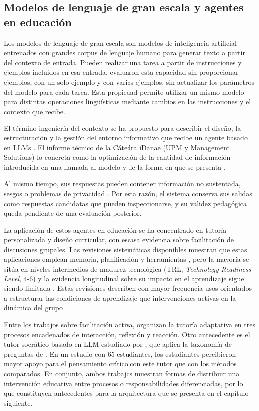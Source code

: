 \subsection{Modelos de lenguaje de gran escala y agentes en educación}

Los modelos de lenguaje de gran escala son modelos de inteligencia artificial entrenados con grandes corpus de lenguaje humano para generar texto a partir del contexto de entrada. Pueden realizar una tarea a partir de instrucciones y ejemplos incluidos en esa entrada. \textcite{BrownEtAl2020} evaluaron esta capacidad sin proporcionar ejemplos, con un solo ejemplo y con varios ejemplos, sin actualizar los parámetros del modelo para cada tarea. Esta propiedad permite utilizar un mismo modelo para distintas operaciones lingüísticas mediante cambios en las instrucciones y el contexto que recibe.

El término ingeniería del contexto se ha propuesto para describir el diseño, la estructuración y la gestión del entorno informativo que recibe un agente basado en LLMs \parencite{Vishnyakova2026}. El informe técnico de la Cátedra iDanae (UPM y Management Solutions) lo concreta como la optimización de la cantidad de información introducida en una llamada al modelo y de la forma en que se presenta \parencite{IdanaeUPM2026}.

Al mismo tiempo, sus respuestas pueden contener información no sustentada, sesgos o problemas de privacidad \parencite{ChuEtAl2025}. Por esta razón, el sistema conserva sus salidas como respuestas candidatas que pueden inspeccionarse, y su validez pedagógica queda pendiente de una evaluación posterior.

La aplicación de estos agentes en educación se ha concentrado en tutoría personalizada y diseño curricular, con escasa evidencia sobre facilitación de discusiones grupales. Las revisiones sistemáticas disponibles muestran que estas aplicaciones emplean memoria, planificación y herramientas \parencite{ChuEtAl2025}, pero la mayoría se sitúa en niveles intermedios de madurez tecnológica (TRL, \textit{Technology Readiness Level}, 4-6) y la evidencia longitudinal sobre su impacto en el aprendizaje sigue siendo limitada \parencite{KostopoulosEtAl2025}. Estas revisiones describen con mayor frecuencia usos orientados a estructurar las condiciones de aprendizaje que intervenciones activas en la dinámica del grupo \parencite{CasebourneEtAl2025}.

Entre los trabajos sobre facilitación activa, \textcite{ChenEtAl2023tutoring} organizan la tutoría adaptativa en tres procesos encadenados de interacción, reflexión y reacción. Otro antecedente es el tutor socrático basado en LLM estudiado por \textcite{DegenAsanov2025}, que aplica la taxonomía de preguntas de \textcite{Paul1990}. En un estudio con 65 estudiantes, los estudiantes percibieron mayor apoyo para el pensamiento crítico con este tutor que con los métodos comparados. En conjunto, ambos trabajos muestran formas de distribuir una intervención educativa entre procesos o responsabilidades diferenciadas, por lo que constituyen antecedentes para la arquitectura que se presenta en el capítulo siguiente.

